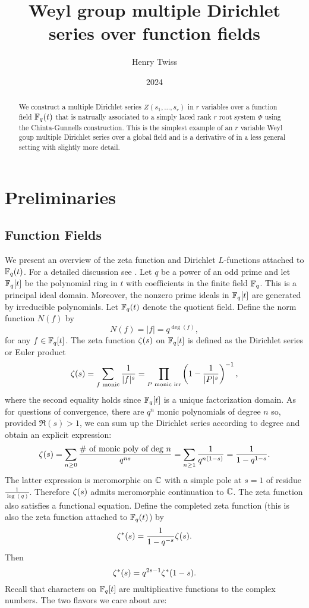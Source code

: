 \documentclass[12pt,reqno,oneside]{amsart}
\title{Weyl group multiple Dirichlet series over function fields}
\author{Henry Twiss}
\date{2024}
\begin{document}
\begin{abstract}
    We construct a multiple Dirichlet series $Z(s_{1},\ldots,s_{r})$ in $r$ variables over a function field $\mathbb{F}_{q}(t)$ that is natrually associated to a simply laced rank $r$ root system $\Phi$ using the Chinta-Gunnells construction. This is the simplest example of an $r$ variable Weyl goup multiple Dirichlet series over a global field and is a derivative of \cite{CG} in a less general setting with slightly more detail. 
\end{abstract}

\maketitle

\section{Preliminaries}
    \subsection*{Function Fields}
        We present an overview of the zeta function and Dirichlet $L$-functions attached to $\mathbb{F}_{q}(t)$. For a detailed discussion see \cite{R}. Let $q$ be a power of an odd prime and let $\mathbb{F}_{q}[t]$ be the polynomial ring in $t$ with coefficients in the finite field $\mathbb{F}_{q}$. This is a principal ideal domain. Moreover, the nonzero prime ideals in $\mathbb{F}_{q}[t]$ are generated by irreducible polynomials. Let $\mathbb{F}_{q}(t)$ denote the quotient field. Define the norm function $N(f)$ by
        \[
            N(f) = |f| = q^{\deg(f)},
        \]
        for any $f \in \mathbb{F}_{q}[t]$. The zeta function $\zeta(s)$ on $\mathbb{F}_{q}[t]$ is defined as the Dirichlet series or Euler product
        \[
            \zeta(s) = \sum_{\text{$f$ monic}}\frac{1}{|f|^{s}} = \prod_{\text{$P$ monic irr}}\left(1-\frac{1}{|P|^{s}}\right)^{-1},
        \]
        where the second equality holds since $\mathbb{F}_{q}[t]$ is a unique factorization domain. As for questions of convergence, there are $q^{n}$ monic polynomials of degree $n$ so, provided $\Re(s) > 1$, we can sum up the Dirichlet series according to degree and obtain an explicit expression:
        \[
            \zeta(s) = \sum_{n \ge 0}\frac{\text{\# of monic poly of deg $n$}}{q^{ns}} = \sum_{n \ge 1}\frac{1}{q^{n(1-s)}} = \frac{1}{1-q^{1-s}}.
        \]
        The latter expression is meromorphic on $\mathbb{C}$ with a simple pole at $s = 1$ of residue $\frac{1}{\log(q)}$. Therefore $\zeta(s)$ admits meromorphic continuation to $\mathbb{C}$. The zeta function also satisfies a functional equation. Define the completed zeta function (this is also the zeta function attached to $\mathbb{F}_{q}(t)$) by
        \[
            \zeta^{\ast}(s) = \frac{1}{1-q^{-s}}\zeta(s).
        \]
        Then
        \[
            \zeta^{\ast}(s) = q^{2s-1}\zeta^{\ast}(1-s).
        \]
        Recall that characters on $\mathbb{F}_{q}[t]$ are multiplicative functions to the complex numbers. The two flavors we care about are:
        
\end{document}
